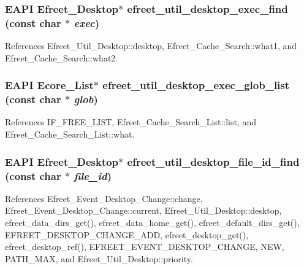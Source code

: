 \subsubsection{\setlength{\rightskip}{0pt plus 5cm}EAPI {\bf Efreet\_\-Desktop}$\ast$ efreet\_\-util\_\-desktop\_\-exec\_\-find (const char $\ast$ {\em exec})}\label{efreet__utils_8h_57cc0bf2b575e2e61d6a6964497b7cd7}




References Efreet\_\-Util\_\-Desktop::desktop, Efreet\_\-Cache\_\-Search::what1, and Efreet\_\-Cache\_\-Search::what2.
\subsubsection{\setlength{\rightskip}{0pt plus 5cm}EAPI Ecore\_\-List$\ast$ efreet\_\-util\_\-desktop\_\-exec\_\-glob\_\-list (const char $\ast$ {\em glob})}\label{efreet__utils_8h_7c89ed2bc708f7be50910457399fe5e6}




References IF\_\-FREE\_\-LIST, Efreet\_\-Cache\_\-Search\_\-List::list, and Efreet\_\-Cache\_\-Search\_\-List::what.
\subsubsection{\setlength{\rightskip}{0pt plus 5cm}EAPI {\bf Efreet\_\-Desktop}$\ast$ efreet\_\-util\_\-desktop\_\-file\_\-id\_\-find (const char $\ast$ {\em file\_\-id})}\label{efreet__utils_8h_151ee6458631eeaf609a337325b7edee}




References Efreet\_\-Event\_\-Desktop\_\-Change::change, Efreet\_\-Event\_\-Desktop\_\-Change::current, Efreet\_\-Util\_\-Desktop::desktop, efreet\_\-data\_\-dirs\_\-get(), efreet\_\-data\_\-home\_\-get(), efreet\_\-default\_\-dirs\_\-get(), EFREET\_\-DESKTOP\_\-CHANGE\_\-ADD, efreet\_\-desktop\_\-get(), efreet\_\-desktop\_\-ref(), EFREET\_\-EVENT\_\-DESKTOP\_\-CHANGE, NEW, PATH\_\-MAX, and Efreet\_\-Util\_\-Desktop::priority.
